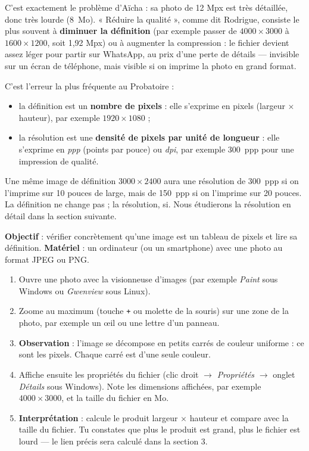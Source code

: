 \documentclass[11pt]{article}
\newcommand{\cle}[1]{{\popxbold\color{popdark}#1}}
\begin{document}
C'est exactement le problème d'Aïcha : sa photo de 12 Mpx est très détaillée, donc très lourde (\SI{8}{Mo}). « Réduire la qualité », comme dit Rodrigue, consiste le plus souvent à \textbf{diminuer la définition} (par exemple passer de $4000 \times 3000$ à $1600 \times 1200$, soit 1,92 Mpx) ou à augmenter la compression : le fichier devient assez léger pour partir sur WhatsApp, au prix d'une perte de détails — invisible sur un écran de téléphone, mais visible si on imprime la photo en grand format.

\begin{attention}
C'est l'erreur la plus fréquente au Probatoire :
\begin{itemize}
\item la \cle{définition} est un \textbf{nombre de pixels} : elle s'exprime en pixels (largeur $\times$ hauteur), par exemple $1920 \times 1080$ ;
\item la \cle{résolution} est une \textbf{densité de pixels par unité de longueur} : elle s'exprime en \emph{ppp} (points par pouce) ou \emph{dpi}, par exemple \SI{300}{ppp} pour une impression de qualité.
\end{itemize}
Une même image de définition $3000 \times 2400$ aura une résolution de \SI{300}{ppp} si on l'imprime sur 10 pouces de large, mais de \SI{150}{ppp} si on l'imprime sur 20 pouces. La définition ne change pas ; la résolution, si. Nous étudierons la résolution en détail dans la section suivante.
\end{attention}

\begin{experience}
\textbf{Objectif} : vérifier concrètement qu'une image est un tableau de pixels et lire sa définition.
\textbf{Matériel} : un ordinateur (ou un smartphone) avec une photo au format JPEG ou PNG.
\begin{enumerate}
\item Ouvre une photo avec la visionneuse d'images (par exemple \emph{Paint} sous Windows ou \emph{Gwenview} sous Linux).
\item Zoome au maximum (touche \texttt{+} ou molette de la souris) sur une zone de la photo, par exemple un œil ou une lettre d'un panneau.
\item \textbf{Observation} : l'image se décompose en petits carrés de couleur uniforme : ce sont les pixels. Chaque carré est d'une seule couleur.
\item Affiche ensuite les propriétés du fichier (clic droit $\rightarrow$ \emph{Propriétés} $\rightarrow$ onglet \emph{Détails} sous Windows). Note les dimensions affichées, par exemple $4000 \times 3000$, et la taille du fichier en Mo.
\item \textbf{Interprétation} : calcule le produit largeur $\times$ hauteur et compare avec la taille du fichier. Tu constates que plus le produit est grand, plus le fichier est lourd — le lien précis sera calculé dans la section 3.
\end{enumerate}
\end{experience}
\end{document}
